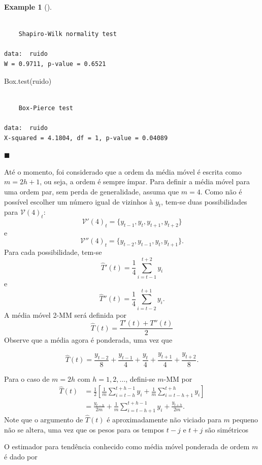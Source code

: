 \documentclass[
  letterpaper,
  DIV=11,
  numbers=noendperiod]{scrartcl}
\newenvironment{Shaded}{\begin{snugshade}}{\end{snugshade}}
\newcommand{\FunctionTok}[1]{\textcolor[rgb]{0.28,0.35,0.67}{#1}}
\newcommand{\NormalTok}[1]{\textcolor[rgb]{0.00,0.23,0.31}{#1}}
\theoremstyle{definition}
\newtheorem{example}{Example}[chapter]
\theoremstyle{definition}
\theoremstyle{plain}
\theoremstyle{plain}
\theoremstyle{remark}
\begin{document}
\begin{example}[]
\begin{verbatim}

    Shapiro-Wilk normality test

data:  ruido
W = 0.9711, p-value = 0.6521
\end{verbatim}

\begin{Shaded}
\begin{Highlighting}[]
\FunctionTok{Box.test}\NormalTok{(ruido)}
\end{Highlighting}
\end{Shaded}

\begin{verbatim}

    Box-Pierce test

data:  ruido
X-squared = 4.1804, df = 1, p-value = 0.04089
\end{verbatim}

\(\blacksquare\)

\end{example}

Até o momento, foi considerado que a ordem da média móvel é escrita como
\(m=2h+1\), ou seja, a ordem é sempre ímpar. Para definir a média móvel
para uma ordem par, sem perda de generalidade, assuma que \(m=4\). Como
não é possível escolher um número igual de vizinhos à \(y_t\), tem-se
duas possibilidades para \(\mathcal{V}(4)_t\):
\[\mathcal{V}'(4)_t=\{y_{t-1},y_t,y_{t+1},y_{t+2}\}\] e
\[\mathcal{V}''(4)_t=\{y_{t-2},y_{t-1},y_t,y_{t+1}\}.\] Para cada
possibilidade, tem-se \[\hat{T}'(t)=\frac{1}{4}\sum_{i=t-1}^{t+2}y_{i}\]
e \[\hat{T}''(t)=\frac{1}{4}\sum_{i=t-2}^{t+1}y_{i}.\] A média móvel
2-MM será definida por \[\hat{T}(t)=\frac{T'(t)+T''(t)}{2}\] Observe que
a média agora é ponderada, uma vez que

\[\hat{T}(t)=\frac{y_{t-2}}{8}+\frac{y_{t-1}}{4}+\frac{y_{t}}{4}+\frac{y_{t+1}}{4}+\frac{y_{t+2}}{8}.\]

Para o caso de \(m=2h\) com \(h=1,2,\ldots\), defini-se \(m\)-MM por
\begin{align}\hat{T}(t)&=\frac{1}{2}\left[\frac{1}{m}\sum_{i=t-h}^{t+h-1}y_i+\frac{1}{m}\sum_{i=t-h+1}^{t+h}y_i\right]\\&=\frac{y_{t-h}}{2m}+\frac{1}{m}\sum_{i=t-h+1}^{t+h-1}y_i+\frac{y_{t+h}}{2m}.\end{align}
Note que o argumento de \(\hat{T}(t)\) é aproximadamente não viciado
para \(m\) pequeno não se altera, uma vez que os pesos para os tempos
\(t-j\) e \(t+j\) são simétricos

O estimador para tendência conhecido como média móvel ponderada de ordem
\(m\) é dado por
\end{document}
